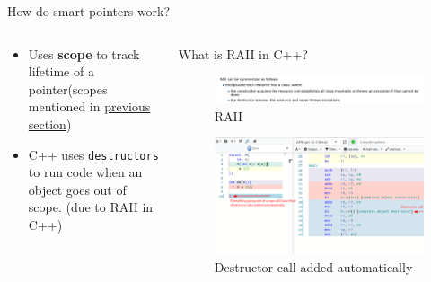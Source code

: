 \documentclass[
  10pt,
  ignorenonframetext,
]{beamer}
\providecommand{\tightlist}{%
  \setlength{\itemsep}{0pt}\setlength{\parskip}{0pt}}
\begin{document}
\begin{frame}{How do smart pointers work?}
\protect\hypertarget{how-do-smart-pointers-work}{}
\begin{columns}[T]
\begin{column}{0.3\textwidth}
\vspace{20pt}

\begin{itemize}
\tightlist
\item
  Uses \textbf{scope} to track lifetime of a
  pointer(scopes mentioned in
  \protect\hyperlink{what-is-this-scope-thing}{previous
  section})
\end{itemize}

\pause

\begin{itemize}
\tightlist
\item
  C++ uses \texttt{destructors} to run code when
  an object goes out of scope. (due to RAII in
  C++)
\end{itemize}

\pause
\end{column}

\begin{column}{0.7\textwidth}
\begin{block}{What is RAII in C++?}
\protect\hypertarget{what-is-raii-in-c}{}
\begin{figure}
\centering
\includegraphics{raii.png}
\caption{RAII}
\end{figure}

\begin{figure}
\centering
\includegraphics{./destructor.png}
\caption{Destructor call added automatically}
\end{figure}
\end{block}
\end{column}
\end{columns}
\end{frame}
\end{document}
